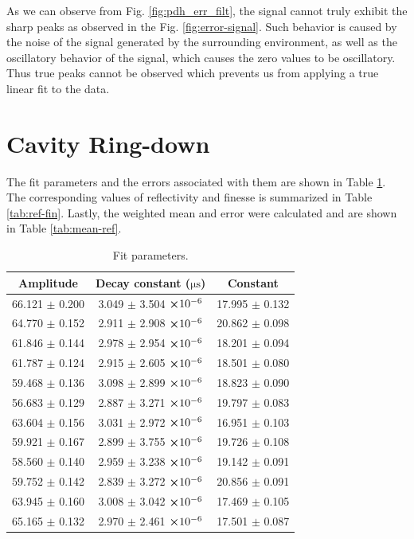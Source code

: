 \documentclass[a4paper]{report}
\numberwithin{equation}{section}
\begin{document}
As we can observe from Fig. \ref{fig:pdh_err_filt}, the signal cannot truly exhibit the sharp peaks as observed in the 
Fig. \ref{fig:error-signal}. Such behavior is caused by the noise of the signal generated by the surrounding environment, as well as the
 oscillatory behavior of the signal, which causes the zero values to be oscillatory. Thus true peaks cannot be observed which 
 prevents us from applying a true linear fit to the data. \par 

\section{Cavity Ring-down}
The fit parameters and the errors associated with them are shown in Table \ref{tab:params}. The corresponding values of reflectivity and finesse is summarized in Table \ref{tab:ref-fin}. Lastly, the weighted mean and error were calculated and are shown in Table \ref{tab:mean-ref}. 

\begin{table}[!ht]
    \centering
    \begin{tabular}{|c|c|c|}
    \hline
        Amplitude & Decay constant ($\si{\micro\second}$) & Constant \\ \hline
        66.121 $\pm$ 0.200 & 3.049 $\pm$ 3.504 $\cross 10^{-6}$ & 17.995 $\pm$ 0.132 \\ \hline
        64.770 $\pm$ 0.152 & 2.911 $\pm$ 2.908 $\cross 10^{-6}$ & 20.862 $\pm$ 0.098 \\ \hline
        61.846 $\pm$ 0.144 & 2.978 $\pm$ 2.954 $\cross 10^{-6}$ & 18.201 $\pm$ 0.094 \\ \hline
        61.787 $\pm$ 0.124 & 2.915 $\pm$ 2.605 $\cross 10^{-6}$ & 18.501 $\pm$ 0.080 \\ \hline
        59.468 $\pm$ 0.136 & 3.098 $\pm$ 2.899 $\cross 10^{-6}$ & 18.823 $\pm$ 0.090 \\ \hline
        56.683 $\pm$ 0.129 & 2.887 $\pm$ 3.271 $\cross 10^{-6}$ & 19.797 $\pm$ 0.083 \\ \hline
        63.604 $\pm$ 0.156 & 3.031 $\pm$ 2.972 $\cross 10^{-6}$ & 16.951 $\pm$ 0.103 \\ \hline
        59.921 $\pm$ 0.167 & 2.899 $\pm$ 3.755 $\cross 10^{-6}$ & 19.726 $\pm$ 0.108 \\ \hline
        58.560 $\pm$ 0.140 & 2.959 $\pm$ 3.238 $\cross 10^{-6}$ & 19.142 $\pm$ 0.091 \\ \hline
        59.752 $\pm$ 0.142 & 2.839 $\pm$ 3.272 $\cross 10^{-6}$ & 20.856 $\pm$ 0.091 \\ \hline
        63.945 $\pm$ 0.160 & 3.008 $\pm$ 3.042 $\cross 10^{-6}$ & 17.469 $\pm$ 0.105 \\ \hline
        65.165 $\pm$ 0.132 & 2.970 $\pm$ 2.461 $\cross 10^{-6}$ & 17.501 $\pm$ 0.087 \\ \hline
    \end{tabular}
    \caption{Fit parameters.}
    \label{tab:params}
\end{table}
\end{document}
